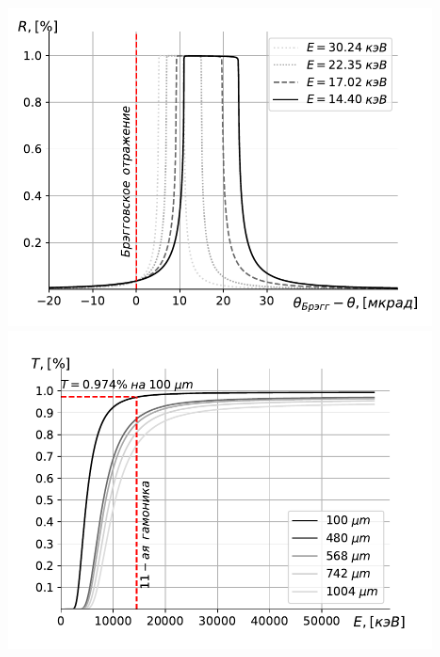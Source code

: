 \documentclass[14pt,a4paper]{extarticle}
\numberwithin{equation}{section}
\begin{document}
\begin{figure}[htbp]
	\centering  
	\begin{minipage}{0.49\textwidth}
		\centering
		\includegraphics[width=\textwidth]{pic/bragg_R.pdf}
		\caption{}
		\label{fig:bragg_R}
	\end{minipage}\hfill
	\begin{minipage}{0.49\textwidth}
		\centering
		\includegraphics[width=\textwidth]{pic/bragg_T.pdf}
		\caption{}
		\label{fig:bragg_T}
	\end{minipage}    
	\begin{minipage}{1.\textwidth}
		\centering  

\end{minipage}
\end{figure}
\end{document}
